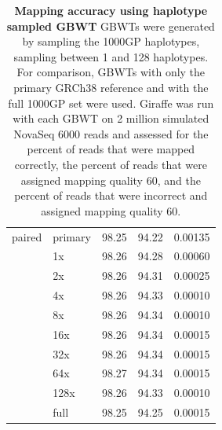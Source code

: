 \documentclass[11pt]{ucscthesis}
\begin{document}
\begin{table}[H]
\begin{tabular}{|l|l|r|r|r|}
        \hline
        paired  & primary   & 98.25     & 94.22     & 0.00135 \\
                & 1x        & 98.26     & 94.28     & 0.00060 \\
                & 2x        & 98.26     & 94.31     & 0.00025 \\
                & 4x        & 98.26     & 94.33     & 0.00010 \\
                & 8x        & 98.26     & 94.34     & 0.00010 \\
                & 16x       & 98.26     & 94.34     & 0.00015 \\
                & 32x       & 98.26     & 94.34     & 0.00015 \\
                & 64x       & 98.27     & 94.34     & 0.00015 \\
                & 128x      & 98.26     & 94.33     & 0.00010 \\
                & full      & 98.25     & 94.25     & 0.00015 \\
                

        \hline
        
    \end{tabular}
    \caption[Mapping accuracy using haplotype sampled GBWT]{\textbf{Mapping accuracy using haplotype sampled GBWT} GBWTs were generated by sampling the 1000GP haplotypes, sampling between 1 and 128 haplotypes. For comparison, GBWTs with only the primary GRCh38 reference and with the full 1000GP set were used. Giraffe was run with each GBWT on 2 million simulated NovaSeq 6000 reads and assessed for the percent of reads that were mapped correctly, the percent of reads that were assigned mapping quality 60, and the percent of reads that were incorrect and assigned mapping quality 60.}
    \label{tab:mapping_accuracy_1000gp_sampled_gbwt}
\end{table}






\def\baselinestretch{1.0}\large\normalsize



\end{document}

